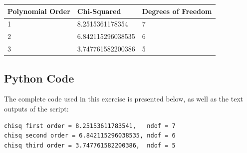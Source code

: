 \documentclass[a4paper]{article}
\begin{document}
\begin{table}[h!]
\centering
\begin{tabular}{lll}
\hline
Polynomial Order & Chi-Squared       & Degrees of Freedom \\ \hline
1                & 8.2515361178354   & 7                  \\
2                & 6.842115296038535 & 6                  \\
3                & 3.747761582200386 & 5                  \\ \hline
\end{tabular}
\end{table}

\begin{appendix}
\section{Python Code}\label{sec:python}
The complete code used in this exercise is presented below, as well as the text outputs of the script:
%
\begin{lstlisting}
chisq first order = 8.25153611783541,	ndof = 7
chisq second order = 6.842115296038535,	ndof = 6
chisq third order = 3.747761582200386,	ndof = 5
\end{lstlisting}

\end{appendix}
\end{document}
